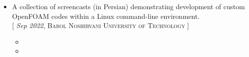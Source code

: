 
\vspace{5pt}

\begin{itemize}
  \item A collection of screencasts (in Persian) demonstrating development of custom OpenFOAM codes within a Linux command-line environment.\\
    {[ {\small\emph{Sep 2022}, \textsc{Babol Noshirvani University of Technology}} ]}
    \begin{itemize}
      \item {}
      \item {}
    \end{itemize}
\end{itemize}
